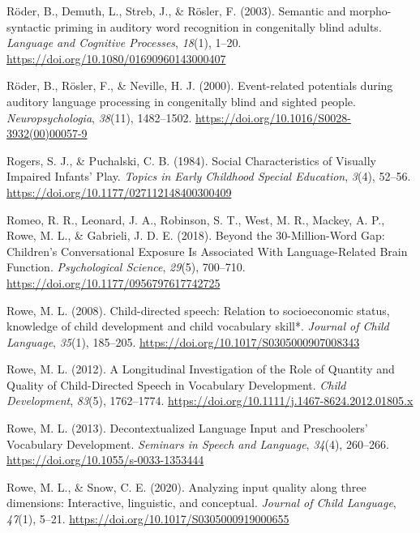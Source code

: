 \documentclass[
  man,floatsintext]{apa6}
\newlength{\cslhangindent}
\newlength{\cslentryspacingunit} %
\newenvironment{CSLReferences}[2] %
 {%
  \setlength{\parindent}{0pt}
  \ifodd #1
  \let\oldpar\par
  \def\par{\hangindent=\cslhangindent\oldpar}
  \fi
  \setlength{\parskip}{#2\cslentryspacingunit}
 }%
 {}
\begin{document}
\begin{CSLReferences}{1}{0}
\leavevmode{}%
Röder, B., Demuth, L., Streb, J., \& Rösler, F. (2003). Semantic and morpho-syntactic priming in auditory word recognition in congenitally blind adults. \emph{Language and Cognitive Processes}, \emph{18}(1), 1--20. \url{https://doi.org/10.1080/01690960143000407}

\leavevmode{}%
Röder, B., Rösler, F., \& Neville, H. J. (2000). Event-related potentials during auditory language processing in congenitally blind and sighted people. \emph{Neuropsychologia}, \emph{38}(11), 1482--1502. \url{https://doi.org/10.1016/S0028-3932(00)00057-9}

\leavevmode{}%
Rogers, S. J., \& Puchalski, C. B. (1984). Social {Characteristics} of {Visually Impaired Infants}' {Play}. \emph{Topics in Early Childhood Special Education}, \emph{3}(4), 52--56. \url{https://doi.org/10.1177/027112148400300409}

\leavevmode{}%
Romeo, R. R., Leonard, J. A., Robinson, S. T., West, M. R., Mackey, A. P., Rowe, M. L., \& Gabrieli, J. D. E. (2018). Beyond the 30-{Million-Word Gap}: {Children}'s {Conversational Exposure Is Associated With Language-Related Brain Function}. \emph{Psychological Science}, \emph{29}(5), 700--710. \url{https://doi.org/10.1177/0956797617742725}

\leavevmode{}%
Rowe, M. L. (2008). Child-directed speech: Relation to socioeconomic status, knowledge of child development and child vocabulary skill*. \emph{Journal of Child Language}, \emph{35}(1), 185--205. \url{https://doi.org/10.1017/S0305000907008343}

\leavevmode{}%
Rowe, M. L. (2012). A {Longitudinal Investigation} of the {Role} of {Quantity} and {Quality} of {Child-Directed Speech} in {Vocabulary Development}. \emph{Child Development}, \emph{83}(5), 1762--1774. \url{https://doi.org/10.1111/j.1467-8624.2012.01805.x}

\leavevmode{}%
Rowe, M. L. (2013). Decontextualized {Language Input} and {Preschoolers}' {Vocabulary Development}. \emph{Seminars in Speech and Language}, \emph{34}(4), 260--266. \url{https://doi.org/10.1055/s-0033-1353444}

\leavevmode{}%
Rowe, M. L., \& Snow, C. E. (2020). Analyzing input quality along three dimensions: Interactive, linguistic, and conceptual. \emph{Journal of Child Language}, \emph{47}(1), 5--21. \url{https://doi.org/10.1017/S0305000919000655}


\end{CSLReferences}
\end{document}
